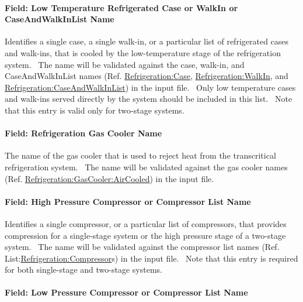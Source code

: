 \paragraph{Field: Low Temperature Refrigerated Case or WalkIn or CaseAndWalkInList Name}\label{field-low-temperature-refrigerated-case-or-walkin-or-caseandwalkinlist-name}

Identifies a single case, a single walk-in, or a particular list of refrigerated cases and walk-ins, that is cooled by the low-temperature stage of the refrigeration system.~ The name will be validated against the case, walk-in, and CaseAndWalkInList names (Ref. \hyperref[refrigerationcase]{Refrigeration:Case}, \hyperref[refrigerationwalkin]{Refrigeration:WalkIn}, and \hyperref[refrigerationcaseandwalkinlist]{Refrigeration:CaseAndWalkInList}) in the input file.~ Only low temperature cases and walk-ins served directly by the system should be included in this list.~ Note that this entry is valid only for two-stage systems.

\paragraph{Field: Refrigeration Gas Cooler Name}\label{field-refrigeration-gas-cooler-name}

The name of the gas cooler that is used to reject heat from the transcritical refrigeration system.~ The name will be validated against the gas cooler names (Ref. \hyperref[refrigerationgascooleraircooled]{Refrigeration:GasCooler:AirCooled}) in the input file.

\paragraph{Field: High Pressure Compressor or Compressor List Name}\label{field-high-pressure-compressor-or-compressor-list-name}

Identifies a single compressor, or a particular list of compressors, that provides compression for a single-stage system or the high pressure stage of a two-stage system.~ The name will be validated against the compressor list names (Ref. List:\hyperref[refrigerationcompressor]{Refrigeration:Compressor}s) in the input file.~ Note that this entry is required for both single-stage and two-stage systems.

\paragraph{Field: Low Pressure Compressor or Compressor List Name}\label{field-low-pressure-compressor-or-compressor-list-name}

